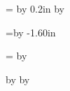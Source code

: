 \tempp = \hlabel  \advance \tempp by 0.2in
\multiply \tempp by \ncols 
\setlength{\textwidth}{\tempp}

\tempp=\vcorner \advance \tempp by -1.60in
\setlength{\topmargin}{\tempp}%

\tempp = \vlabel \multiply\tempp by \nrows 

\setlength{\textheight}{\tempp}
\setlength{\headheight}{-.6in}
\setlength{\footheight}{0in}
\setlength{\baselineskip}{0in}
\setlength{\fboxsep}{0in}	%
\setlength{\parskip}{0in}
\setlength{\headsep}{0in}

\advance \vlabel by \vfudge
\advance \hlabel by \hfudge

\newcommand{\lb}[1]{
\fill 0.1in
\mbox{		\rule[-\vlabel]{0in}{\vlabel} %
		\begin{minipage}[t]{\hlabel}
			\begin{flushleft}
			{\sf #1}
			\end{flushleft}
		\end{minipage}
	}
}




\raggedbottom
\raggedright



